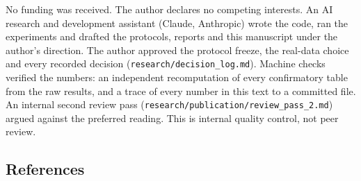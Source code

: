 \documentclass[
]{article}
\begin{document}
No funding was received. The author declares no competing interests. An
AI research and development assistant (Claude, Anthropic) wrote the
code, ran the experiments and drafted the protocols, reports and this
manuscript under the author's direction. The author approved the
protocol freeze, the real-data choice and every recorded decision
(\texttt{research/decision\_log.md}). Machine checks verified the
numbers: an independent recomputation of every confirmatory table from
the raw results, and a trace of every number in this text to a committed
file. An internal second review pass
(\texttt{research/publication/review\_pass\_2.md}) argued against the
preferred reading. This is internal quality control, not peer review.

\subsection{References}\label{references}
\end{document}
